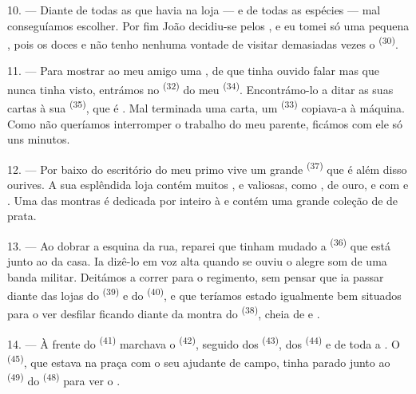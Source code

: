 10. --- Diante de todas as  que havia na loja ---
 e  de todas as
espécies --- mal conseguíamos escolher. Por fim João decidiu-se pelos
, e eu tomei só uma pequena , pois os doces  e não tenho nenhuma
vontade de visitar demasiadas vezes o  \textsuperscript{(30)}.

\VUsaut{3.0mm}

11. --- Para mostrar ao meu amigo uma , de que
tinha ouvido falar mas que nunca tinha visto, entrámos no
 \textsuperscript{(32)} do meu  \textsuperscript{(34)}.
Encontrámo-lo a ditar as suas cartas à sua 
\textsuperscript{(35)}, que é . Mal terminada uma carta, um
 \textsuperscript{(33)} copiava-a à máquina. Como não
queríamos interromper o trabalho do meu parente, ficámos com ele só uns
minutos.

12. --- Por baixo do escritório do meu primo vive um grande
 \textsuperscript{(37)} que é além disso ourives. A
sua esplêndida loja contém muitos ,  e  valiosas, como
,  de ouro,  e
 com  e . Uma das
montras é dedicada por inteiro à  e contém uma grande
coleção de  de prata.

13. --- Ao dobrar a esquina da rua, reparei que tinham mudado a
 \textsuperscript{(36)} que está junto ao  da casa. Ia
dizê-lo em voz alta quando se ouviu o alegre som de uma banda militar.
Deitámos a correr para o regimento, sem pensar que ia passar diante das
lojas do  \textsuperscript{(39)} e do 
\textsuperscript{(40)}, e que teríamos estado igualmente bem situados para o ver
desfilar ficando diante da montra do  \textsuperscript{(38)}, cheia
de  e .

\VUsaut{3.0mm}

14. --- À frente do  \textsuperscript{(41)} marchava o
 \textsuperscript{(42)}, seguido dos 
\textsuperscript{(43)}, dos  \textsuperscript{(44)} e de toda a
. O  \textsuperscript{(45)}, que estava na praça com o
seu ajudante de campo, tinha parado junto ao 
\textsuperscript{(49)} do  \textsuperscript{(48)} para ver o
.

